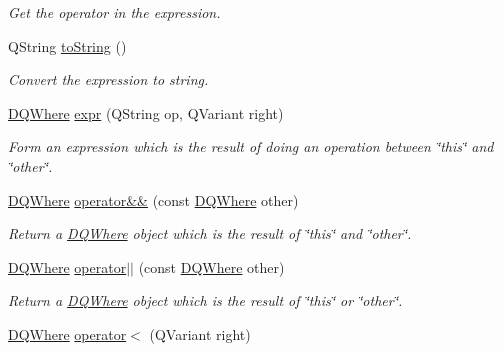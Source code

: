 \begin{DoxyCompactItemize}
\begin{DoxyCompactList}\small\item\em Get the operator in the expression. \item\end{DoxyCompactList}\item 
\hypertarget{classDQWhere_a46cc776af39a3999ebadece429a9c334}{
QString \hyperlink{classDQWhere_a46cc776af39a3999ebadece429a9c334}{toString} ()}
\label{classDQWhere_a46cc776af39a3999ebadece429a9c334}

\begin{DoxyCompactList}\small\item\em Convert the expression to string. \item\end{DoxyCompactList}\item 
\hyperlink{classDQWhere}{DQWhere} \hyperlink{classDQWhere_a392acbbc5a0363544719355eddd2c708}{expr} (QString op, QVariant right)
\begin{DoxyCompactList}\small\item\em Form an expression which is the result of doing an operation between \char`\"{}this\char`\"{} and \char`\"{}other\char`\"{}. \item\end{DoxyCompactList}\item 
\hypertarget{classDQWhere_a8121755219034719b14b00516d26b9af}{
\hyperlink{classDQWhere}{DQWhere} \hyperlink{classDQWhere_a8121755219034719b14b00516d26b9af}{operator\&\&} (const \hyperlink{classDQWhere}{DQWhere} other)}
\label{classDQWhere_a8121755219034719b14b00516d26b9af}

\begin{DoxyCompactList}\small\item\em Return a \hyperlink{classDQWhere}{DQWhere} object which is the result of \char`\"{}this\char`\"{} and \char`\"{}other\char`\"{}. \item\end{DoxyCompactList}\item 
\hypertarget{classDQWhere_a4dd0dd467840f091aa2ac61e26b00771}{
\hyperlink{classDQWhere}{DQWhere} \hyperlink{classDQWhere_a4dd0dd467840f091aa2ac61e26b00771}{operator$|$$|$} (const \hyperlink{classDQWhere}{DQWhere} other)}
\label{classDQWhere_a4dd0dd467840f091aa2ac61e26b00771}

\begin{DoxyCompactList}\small\item\em Return a \hyperlink{classDQWhere}{DQWhere} object which is the result of \char`\"{}this\char`\"{} or \char`\"{}other\char`\"{}. \item\end{DoxyCompactList}\item 
\hypertarget{classDQWhere_a71e855f1109c18c75ae808b03f4144b8}{
\hyperlink{classDQWhere}{DQWhere} \hyperlink{classDQWhere_a71e855f1109c18c75ae808b03f4144b8}{operator$<$} (QVariant right)}
\label{classDQWhere_a71e855f1109c18c75ae808b03f4144b8}


\end{DoxyCompactItemize}
